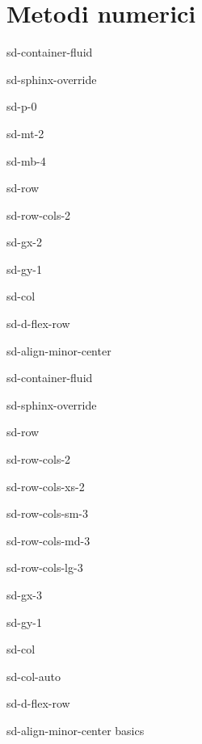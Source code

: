 \documentclass[letterpaper,10pt,english]{jupyterBook}
\begin{document}
\part{Metodi numerici}

\sphinxstepscope

\begin{sphinxuseclass}{sd-container-fluid}
\begin{sphinxuseclass}{sd-sphinx-override}
\begin{sphinxuseclass}{sd-p-0}
\begin{sphinxuseclass}{sd-mt-2}
\begin{sphinxuseclass}{sd-mb-4}
\begin{sphinxuseclass}{sd-row}
\begin{sphinxuseclass}{sd-row-cols-2}
\begin{sphinxuseclass}{sd-gx-2}
\begin{sphinxuseclass}{sd-gy-1}
\begin{sphinxuseclass}{sd-col}
\begin{sphinxuseclass}{sd-d-flex-row}
\begin{sphinxuseclass}{sd-align-minor-center}
\begin{sphinxuseclass}{sd-container-fluid}
\begin{sphinxuseclass}{sd-sphinx-override}
\begin{sphinxuseclass}{sd-row}
\begin{sphinxuseclass}{sd-row-cols-2}
\begin{sphinxuseclass}{sd-row-cols-xs-2}
\begin{sphinxuseclass}{sd-row-cols-sm-3}
\begin{sphinxuseclass}{sd-row-cols-md-3}
\begin{sphinxuseclass}{sd-row-cols-lg-3}
\begin{sphinxuseclass}{sd-gx-3}
\begin{sphinxuseclass}{sd-gy-1}
\begin{sphinxuseclass}{sd-col}
\begin{sphinxuseclass}{sd-col-auto}
\begin{sphinxuseclass}{sd-d-flex-row}
\begin{sphinxuseclass}{sd-align-minor-center}
\sphinxAtStartPar
basics


\end{sphinxuseclass}
\end{sphinxuseclass}
\end{sphinxuseclass}
\end{sphinxuseclass}
\end{sphinxuseclass}
\end{sphinxuseclass}
\end{sphinxuseclass}
\end{sphinxuseclass}
\end{sphinxuseclass}
\end{sphinxuseclass}
\end{sphinxuseclass}
\end{sphinxuseclass}
\end{sphinxuseclass}
\end{sphinxuseclass}
\end{sphinxuseclass}
\end{sphinxuseclass}
\end{sphinxuseclass}
\end{sphinxuseclass}
\end{sphinxuseclass}
\end{sphinxuseclass}
\end{sphinxuseclass}
\end{sphinxuseclass}
\end{sphinxuseclass}
\end{sphinxuseclass}
\end{sphinxuseclass}
\end{sphinxuseclass}
\end{document}
